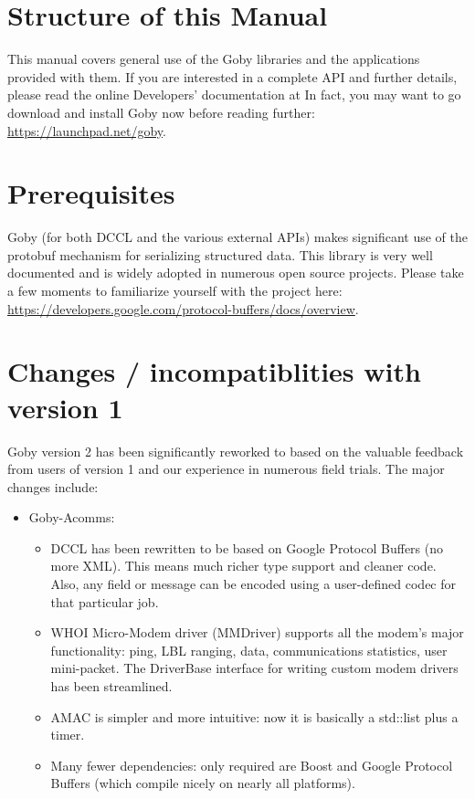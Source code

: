 \section{Structure of this Manual}
This manual covers general use of the Goby libraries and the applications provided with them. If you are interested in a complete API and further details, please read the online Developers' documentation at \cite{goby-doc} In fact, you may want to go download and install Goby now before reading further: \url{https://launchpad.net/goby}.

\section{Prerequisites}
Goby (for both DCCL and the various external APIs) makes significant use of the \gls{protobuf} mechanism for serializing structured data. This library is very well documented and is widely adopted in numerous open source projects. Please take a few moments to familiarize yourself with the project here: \url{https://developers.google.com/protocol-buffers/docs/overview}.


\section{Changes / incompatiblities with version 1}

Goby version 2 has been significantly reworked to based on the valuable feedback from users of version 1 and our experience in numerous field trials.
 The major changes include:
\begin{itemize}
\item Goby-Acomms:
\begin{itemize}
\item DCCL has been rewritten to be based on Google Protocol Buffers (no more XML). This means much richer type support and cleaner code. Also,
any field or message can be encoded using a user-defined codec for that particular job.
\item WHOI Micro-Modem driver (MMDriver) supports all the modem's major functionality: ping, LBL ranging, data, communications statistics, user mini-packet. The DriverBase interface for writing custom modem drivers has been streamlined.
\item AMAC is simpler and more intuitive: now it is basically a std::list plus a timer.
\item Many fewer dependencies: only required are Boost and Google Protocol Buffers (which compile nicely on nearly all platforms).
\end{itemize}
\end{itemize}

